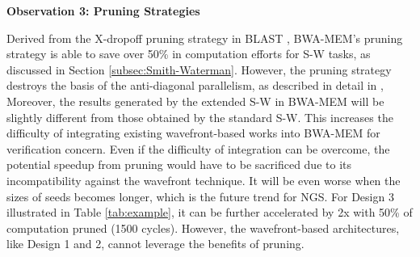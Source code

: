
\vspace{1pt}
\textbf{Observation 3: Pruning Strategies}
\vspace{1pt}

Derived from the X-dropoff pruning strategy in BLAST \cite{BLAST1990}, 
BWA-MEM's pruning strategy is able to save over 50\% in computation efforts for S-W tasks, as discussed in Section \ref{subsec:Smith-Waterman}. 
However, the pruning strategy destroys the basis of the anti-diagonal parallelism, as described in detail in \cite{BWA-MEM}, 
Moreover, the results generated by the extended S-W in BWA-MEM will be slightly different from those obtained by the standard S-W. 
This increases the difficulty of integrating existing wavefront-based works into BWA-MEM for verification concern. 
Even if the difficulty of integration can be overcome, 
the potential speedup from pruning would have to be sacrificed due to its incompatibility against the wavefront technique.
It will be even worse when the sizes of seeds becomes longer, which is the future trend for NGS.
For Design 3 illustrated in Table \ref{tab:example}, it can be further accelerated by 2x with 50\% of computation pruned (1500 cycles). 
However, the wavefront-based architectures, like Design 1 and 2, cannot leverage the benefits of pruning.



